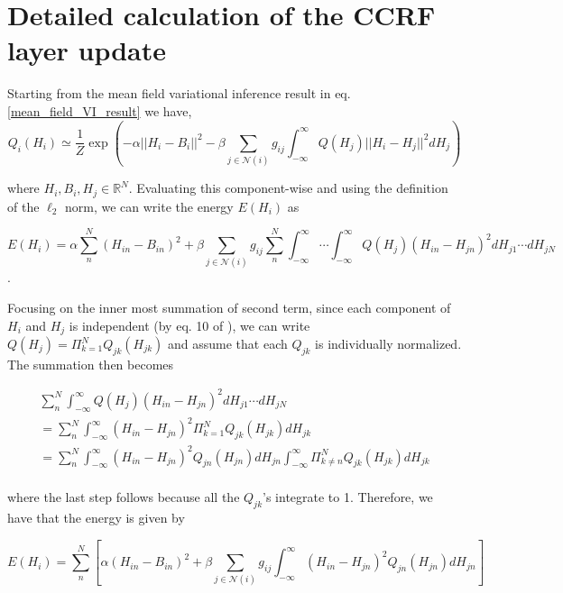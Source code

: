 



\section{Detailed calculation of the CCRF layer update}
Starting from the mean field variational inference result in eq. \ref{mean_field_VI_result} we have, %
\label{crf_detailed}
\begin{equation}
Q_i (H_i) \simeq \frac{1}{Z} \exp \left ( - \alpha || H_i - B_i ||^2  - \beta \sum_{j \in \mathcal{N}(i)} g_{ij} \int_{-\infty}^{\infty} Q(H_j) ||H_i - H_j ||^2 d H_j\right )
\end{equation}

where $H_i, B_i, H_j \in \mathbb{R}^N$. Evaluating this component-wise and using the definition of the $\ell_2$ norm, we can write the energy $E(H_i)$ as

\begin{equation}
E(H_i) = \alpha \sum_n^N (H_{in} - B_{in})^2 + \beta \sum_{j \in \mathcal{N}(i)} g_{ij} \sum_n^N \int_{-\infty}^{\infty} \cdots \int_{-\infty}^{\infty} Q(H_j) (H_{in} - H_{jn})^2 d H_{j1}\cdots dH_{jN}
\end{equation}.

Focusing on the inner most summation of second term, since each component of $H_i$ and $H_j$ is independent (by eq. 10 of ), we can write $Q(H_j) = \Pi_{k=1}^N Q_{jk}(H_{jk})$ and assume that each $Q_{jk}$ is individually normalized. The summation then becomes

\begin{multline}
 \sum_n^N \int_{-\infty}^{\infty}  Q(H_j) (H_{in} - H_{jn})^2 d H_{j1}\cdots dH_{jN} \\
= \sum_n^N \int_{-\infty}^{\infty} (H_{in} - H_{jn})^2  \Pi_{k=1}^N Q_{jk}(H_{jk}) d H_{jk} \\
= \sum_n^N \int_{-\infty}^{\infty} (H_{in} - H_{jn})^2  Q_{jn}(H_{jn}) d H_{jn}\int_{-\infty}^{\infty}  \Pi_{k\neq n}^N Q_{jk}(H_{jk}) d H_{jk} \\
\end{multline} 

where the last step follows because all the $Q_{jk}$'s integrate to 1. Therefore, we have that the energy is given by

\begin{equation}
E(H_i) = \sum_n^N \left [ \alpha (H_{in} - B_{in})^2 + \beta \sum_{j \in \mathcal{N}(i)} g_{ij}  \int_{-\infty}^{\infty} (H_{in} - H_{jn})^2  Q_{jn}(H_{jn}) d H_{jn} \right ]
\end{equation}

